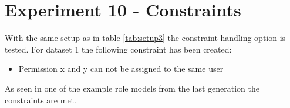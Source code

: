 \newpage
\section{Experiment 10 - Constraints}
\label{sec:exp10}
With the same setup as in table \ref{tab:setup3} the constraint handling option is tested. For dataset 1 the following constraint has been created:
\begin{itemize}
    \item Permission x and y can not be assigned to the same user
\end{itemize}
As seen in one of the example role models from the last generation the constraints are met.


